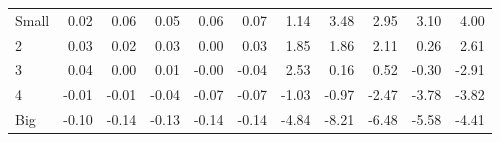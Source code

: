 \begin{table}[!ht]
\begin{tabular}{lrrrrrrrrrr}
    \\
      \cmidrule(r){2-6} \cmidrule(r){7-11}

    Small   & 0.02  & 0.06  & 0.05  & 0.06  & 0.07  & 1.14  & 3.48  & 2.95  & 3.10  & 4.00  \\
         2  & 0.03  & 0.02  & 0.03  & 0.00  & 0.03  & 1.85  & 1.86  & 2.11  & 0.26  & 2.61  \\
         3  & 0.04  & 0.00  & 0.01  & -0.00  & -0.04  & 2.53  & 0.16  & 0.52  & -0.30  & -2.91  \\
         4  & -0.01  & -0.01  & -0.04  & -0.07  & -0.07  & -1.03  & -0.97  & -2.47  & -3.78  & -3.82  \\
    Big     & -0.10  & -0.14  & -0.13  & -0.14  & -0.14  & -4.84  & -8.21  & -6.48  & -5.58  & -4.41  \\

  

  \bottomrule
\end{tabular}
\label{tbl:25_Size_Beta_C1997}
\end{table}